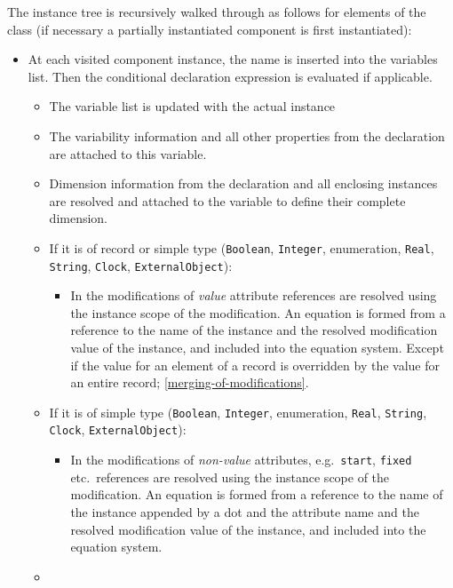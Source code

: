 The instance tree is recursively walked through as follows for elements
of the class (if necessary a partially instantiated component is first
instantiated):
\begin{itemize}
\item
  At each visited component instance, the name is inserted into the
  variables list. Then the conditional declaration expression is
  evaluated if applicable.
  \begin{itemize}
  \item
    The variable list is updated with the actual instance
  \item
    The variability information and all other properties from the
    declaration are attached to this variable.
  \item
    Dimension information from the declaration and all enclosing
    instances are resolved and attached to the variable to define their
    complete dimension.
  \item
    If it is of record or simple type (\lstinline!Boolean!, \lstinline!Integer!, enumeration,
    \lstinline!Real!, \lstinline!String!, \lstinline!Clock!, \lstinline!ExternalObject!):
    \begin{itemize}
    \item
      In the modifications of \emph{value} attribute references are
      resolved using the instance scope of the modification. An equation
      is formed from a reference to the name of the instance and the
      resolved modification value of the instance, and included into the
      equation system. Except if the value for an element of a record is
      overridden by the value for an entire record; \cref{merging-of-modifications}.
    \end{itemize}
  \item
    If it is of simple type (\lstinline!Boolean!, \lstinline!Integer!, enumeration, \lstinline!Real!,
    \lstinline!String!, \lstinline!Clock!, \lstinline!ExternalObject!):
    \begin{itemize}
    \item
      In the modifications of \emph{non-value} attributes, e.g.\ \lstinline!start!,
      \lstinline!fixed! etc.\ references are resolved using the instance scope of the
      modification. An equation is formed from a reference to the name
      of the instance appended by a dot and the attribute name and the
      resolved modification value of the instance, and included into the
      equation system.
    \end{itemize}
  \item

\end{itemize}
\end{itemize}
